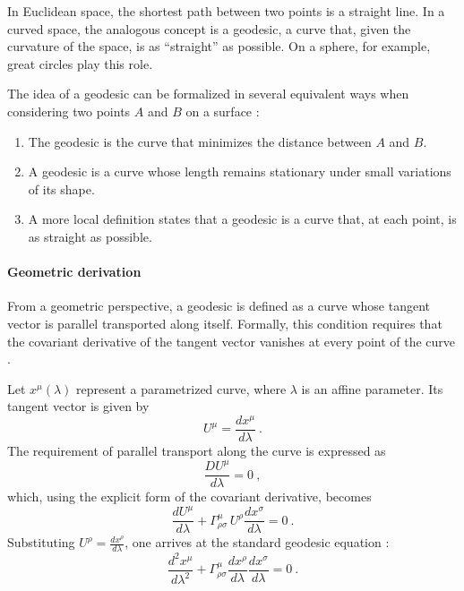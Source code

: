 In Euclidean space, the shortest path between two points is a straight line. In a curved space, the analogous concept is a geodesic, a curve that, given the curvature of the space, is as ``straight'' as possible. On a sphere, for example, great circles play this role. 

The idea of a geodesic can be formalized in several equivalent ways when considering two points $A$ and $B$ on a surface \cite{llibretheoreticalminimum}:
\begin{enumerate}
    \item The geodesic is the curve that minimizes the distance between $A$ and $B$.
    \item A geodesic is a curve whose length remains stationary under small variations of its shape.
    \item A more local definition states that a geodesic is a curve that, at each point, is as straight as possible.
\end{enumerate}

\paragraph{Geometric derivation}

From a geometric perspective, a geodesic is defined as a curve whose tangent vector is parallel transported along itself. Formally, this condition requires that the covariant derivative of the tangent vector vanishes at every point of the curve \cite{LlibreBertJanssen}.  

Let \(x^\mu(\lambda)\) represent a parametrized curve, where \(\lambda\) is an affine parameter. Its tangent vector is given by
\begin{equation}
    U^\mu = \frac{dx^\mu}{d\lambda} \ .
\end{equation}
The requirement of parallel transport along the curve is expressed as
\begin{equation}
    \frac{D U^\mu}{d\lambda} = 0 \ ,
\end{equation}
which, using the explicit form of the covariant derivative, becomes
\begin{equation}
    \frac{dU^\mu}{d\lambda} + \Gamma^{\mu}_{\rho\sigma} \, U^\rho \frac{dx^\sigma}{d\lambda} = 0 \ .
\end{equation}
Substituting \(U^\rho = \frac{dx^\rho}{d\lambda}\), one arrives at the standard geodesic equation \cite{llibrecarroll2004lectures}:
\begin{equation}
    \frac{d^2 x^\mu}{d\lambda^2} + \Gamma^{\mu}_{\rho\sigma} \frac{dx^\rho}{d\lambda} \frac{dx^\sigma}{d\lambda} = 0 \ .
    \label{geodesicequation}
\end{equation}

